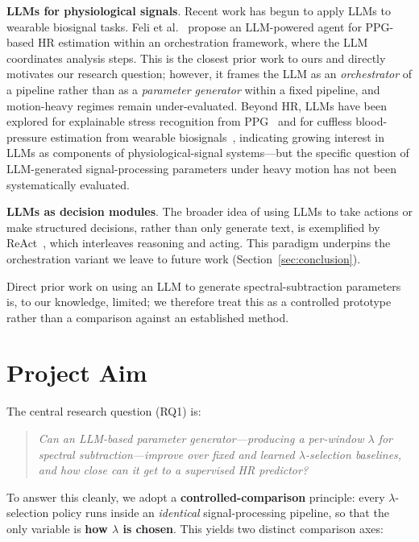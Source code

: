 \documentclass[sigconf,nonacm,11pt]{acmart}
\begin{document}
\textbf{LLMs for physiological signals}. Recent work has begun to apply LLMs to wearable biosignal tasks. Feli et al.~\cite{Feli2025} propose an LLM-powered agent for PPG-based HR estimation within an orchestration framework, where the LLM coordinates analysis steps. This is the closest prior work to ours and directly motivates our research question; however, it frames the LLM as an \emph{orchestrator} of a pipeline rather than as a \emph{parameter generator} within a fixed pipeline, and motion-heavy regimes remain under-evaluated. Beyond HR, LLMs have been explored for explainable stress recognition from PPG~\cite{Can2026} and for cuffless blood-pressure estimation from wearable biosignals~\cite{Liu2024}, indicating growing interest in LLMs as components of physiological-signal systems---but the specific question of LLM-generated signal-processing parameters under heavy motion has not been systematically evaluated.

\textbf{LLMs as decision modules}. The broader idea of using LLMs to take actions or make structured decisions, rather than only generate text, is exemplified by ReAct~\cite{ReAct}, which interleaves reasoning and acting. This paradigm underpins the orchestration variant we leave to future work (Section~\ref{sec:conclusion}).

Direct prior work on using an LLM to generate spectral-subtraction parameters is, to our knowledge, limited; we therefore treat this as a controlled prototype rather than a comparison against an established method.

\section{Project Aim}

The central research question (RQ1) is:

\begin{quote}
\emph{Can an LLM-based parameter generator---producing a per-window $\lambda$ for spectral subtraction---improve over fixed and learned $\lambda$-selection baselines, and how close can it get to a supervised HR predictor?}
\end{quote}

To answer this cleanly, we adopt a \textbf{controlled-comparison} principle: every $\lambda$-selection policy runs inside an \emph{identical} signal-processing pipeline, so that the only variable is \textbf{how $\lambda$ is chosen}. This yields two distinct comparison axes:
\end{document}
